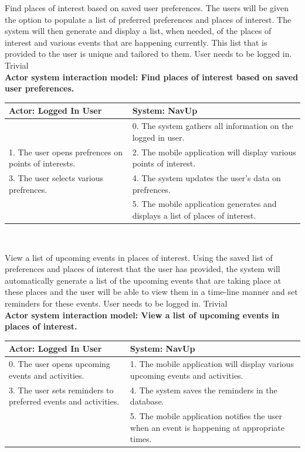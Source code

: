 \FuncReq
{Find places of interest based on saved user preferences.}
{The users will be given the option to populate a list of preferred preferences and places of interest. The system will then generate and display a list, when needed, of the  places of interest and various events that are happening currently. This list that is provided to the user is unique and tailored to them.}
{User needs to be logged in.}
{Trivial}
\\
    \textbf{Actor system interaction model: Find places of interest based on saved user preferences. }\\
    \begin{tabular}{ | p{6cm} | p{6cm} |}
    \hline
    Actor: Logged In User & System: NavUp \\ \hline
    & 0. The system gathers all information on the logged in user.\\ \hline
    1. The user opens prefrences on points of interests. & 2. The mobile application will display various points of interest.\\ \hline
    3. The user selects various prefrences. & 4. The system updates the user's data on prefrences. \\ \hline
    & 5. The mobile application generates and displays a list of places of interest. \\ \hline
    \end{tabular}
\\
\bigskip

\FuncReq
{View a list of upcoming events in places of interest.}
{Using the saved list of preferences and places of interest that the user has provided, the system will automatically generate a list of the upcoming events that are taking place at these places and the user will be able to view them in a time-line manner and set reminders for these events.}
{User needs to be logged in.}
{Trivial}
\\
    \textbf{Actor system interaction model: View a list of upcoming events in places of interest. }\\
    \begin{tabular}{ | p{6cm} | p{6cm} |}
    \hline
    Actor: Logged In User & System: NavUp \\ \hline
    0. The user opens upcoming events and activities. & 1. The mobile application will display various upcoming events and activities.\\ \hline
    3. The user sets reminders to preferred events and activities. & 4. The system saves the reminders in the database. \\ \hline
    & 5. The mobile application notifies the user when an event is happening at appropriate times. \\ \hline
    \end{tabular}
\\
\bigskip

